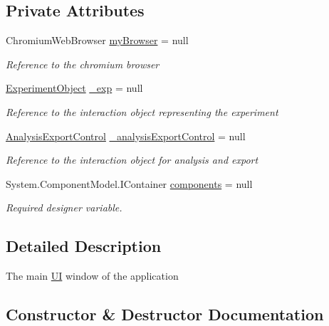 \subsection*{Private Attributes}
\begin{DoxyCompactItemize}
\item 
Chromium\+Web\+Browser \hyperlink{class_web_analyzer_1_1_u_i_1_1_h_t_m_l_u_i_a5f4700cfc8d03cdc4927814acbd0a5dc}{my\+Browser} = null
\begin{DoxyCompactList}\small\item\em Reference to the chromium browser \end{DoxyCompactList}\item 
\hyperlink{class_web_analyzer_1_1_u_i_1_1_interaction_objects_1_1_experiment_object}{Experiment\+Object} \hyperlink{class_web_analyzer_1_1_u_i_1_1_h_t_m_l_u_i_a39034582b0bcec2f24942ba2661829ec}{\+\_\+exp} = null
\begin{DoxyCompactList}\small\item\em Reference to the interaction object representing the experiment \end{DoxyCompactList}\item 
\hyperlink{class_web_analyzer_1_1_u_i_1_1_interaction_objects_1_1_analysis_export_control}{Analysis\+Export\+Control} \hyperlink{class_web_analyzer_1_1_u_i_1_1_h_t_m_l_u_i_acf16c624451c1154268d8fe9fe82e62c}{\+\_\+analysis\+Export\+Control} = null
\begin{DoxyCompactList}\small\item\em Reference to the interaction object for analysis and export \end{DoxyCompactList}\item 
System.\+Component\+Model.\+I\+Container \hyperlink{class_web_analyzer_1_1_u_i_1_1_h_t_m_l_u_i_ad803fa08573756d8039c07fbfd62c851}{components} = null
\begin{DoxyCompactList}\small\item\em Required designer variable. \end{DoxyCompactList}\end{DoxyCompactItemize}


\subsection{Detailed Description}
The main \hyperlink{namespace_web_analyzer_1_1_u_i}{U\+I} window of the application 



\subsection{Constructor \& Destructor Documentation}
\hypertarget{class_web_analyzer_1_1_u_i_1_1_h_t_m_l_u_i_aaaa68b7c3f90ecdd0bf051d1661004a4}{}
